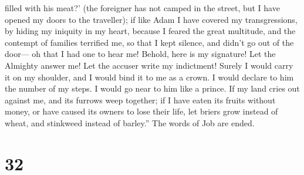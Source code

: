 filled with his meat?'  (the foreigner has not camped in
the street, but I have opened my doors to the traveller); 
if like Adam I have covered my transgressions, by hiding my iniquity in
my heart,  because I feared the great multitude, and the
contempt of families terrified me, so that I kept silence, and didn't go
out of the door---  oh that I had one to hear me! Behold,
here is my signature! Let the Almighty answer me! Let the accuser write
my indictment!  Surely I would carry it on my shoulder, and
I would bind it to me as a crown.  I would declare to him
the number of my steps. I would go near to him like a prince.
 If my land cries out against me, and its furrows weep
together;  if I have eaten its fruits without money, or
have caused its owners to lose their life,  let briers grow
instead of wheat, and stinkweed instead of barley.'' The words of Job
are ended.

\hypertarget{section-17}{%
\section{32}\label{section-17}}

